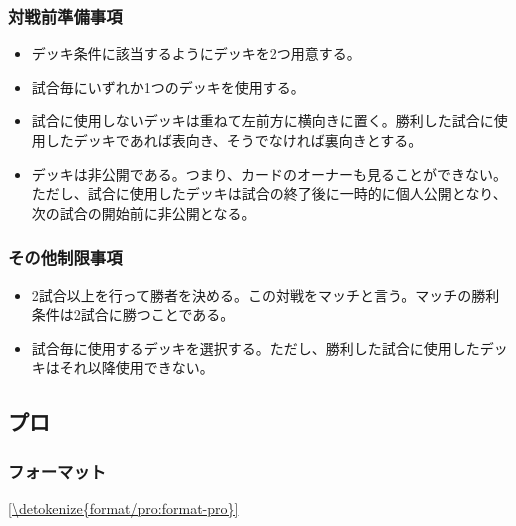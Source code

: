 \documentclass[letterpaper,10pt,dvipdfmx]{sphinxmanual}
\begin{document}
\subsubsection{対戦前準備事項}
\label{\detokenize{match-regulations/standard_randomhalf:id4}}\begin{itemize}
\item {} 
\sphinxAtStartPar
デッキ条件に該当するようにデッキを2つ用意する。

\item {} 
\sphinxAtStartPar
試合毎にいずれか1つのデッキを使用する。

\item {} 
\sphinxAtStartPar
試合に使用しないデッキは重ねて左前方に横向きに置く。勝利した試合に使用したデッキであれば表向き、そうでなければ裏向きとする。

\item {} 
\sphinxAtStartPar
デッキは非公開である。つまり、カードのオーナーも見ることができない。ただし、試合に使用したデッキは試合の終了後に一時的に個人公開となり、次の試合の開始前に非公開となる。

\end{itemize}


\subsubsection{その他制限事項}
\label{\detokenize{match-regulations/standard_randomhalf:id5}}\begin{itemize}
\item {} 
\sphinxAtStartPar
2試合以上を行って勝者を決める。この対戦をマッチと言う。マッチの勝利条件は2試合に勝つことである。

\item {} 
\sphinxAtStartPar
試合毎に使用するデッキを選択する。ただし、勝利した試合に使用したデッキはそれ以降使用できない。

\end{itemize}

\sphinxstepscope


\subsection{プロ}
\label{\detokenize{match-regulations/pro:id1}}\label{\detokenize{match-regulations/pro::doc}}

\subsubsection{フォーマット}
\label{\detokenize{match-regulations/pro:id2}}
\sphinxAtStartPar
\hyperref[\detokenize{format/pro:format-pro}]{\ref{\detokenize{format/pro:format-pro}} }
\end{document}
